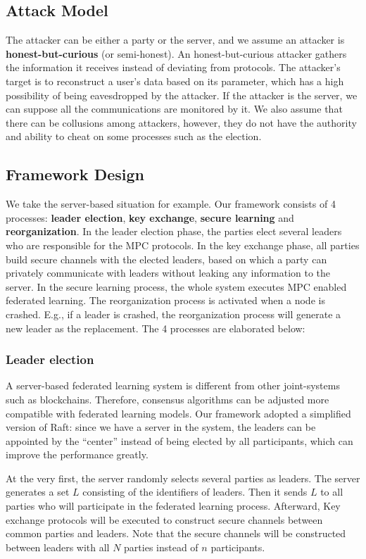 \subsection{Attack Model}
The attacker can be either a party or the server, and we assume an attacker is \textbf{honest-but-curious} (or semi-honest). An honest-but-curious attacker gathers the information it receives instead of deviating from protocols. The attacker's target is to reconstruct a user's data based on its parameter, which has a high possibility of being eavesdropped by the attacker. If the attacker is the server, we can suppose all the communications are monitored by it. We also assume that there can be collusions among attackers, however, they do not have the authority and ability to cheat on some processes such as the election.

\subsection{Framework Design}
We take the server-based situation for example. Our framework consists of 4 processes: \textbf{leader election}, \textbf{key exchange}, \textbf{secure learning} and \textbf{reorganization}. In the leader election phase, the parties elect several leaders who are responsible for the MPC protocols. In the key exchange phase, all parties build secure channels with the elected leaders, based on which a party can privately communicate with leaders without leaking any information to the server. In the secure learning process, the whole system executes MPC enabled federated learning. The reorganization process is activated when a node is crashed. E.g., if a leader is crashed, the reorganization process will generate a new leader as the replacement. The 4 processes are elaborated below:

\subsubsection{\textbf{Leader election}}
A server-based federated learning system is different from other joint-systems such as blockchains. Therefore, consensus algorithms can be adjusted more compatible with federated learning models. Our framework adopted a simplified version of Raft: since we have a server in the system, the leaders can be appointed by the ``center'' instead of being elected by all participants, which can improve the performance greatly. 

At the very first, the server randomly selects several parties as leaders. The server generates a set $L$ consisting of the identifiers of leaders. Then it sends $L$ to all parties who will participate in the federated learning process. Afterward, Key exchange protocols will be executed to construct secure channels between common parties and leaders. Note that the secure channels will be constructed between leaders with all $N$ parties instead of $n$ participants.

